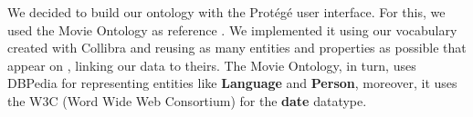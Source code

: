 We decided to build our ontology with the Protégé user interface. For this, we used the Movie Ontology as reference 
\cite{movieontology}. We implemented it using our vocabulary created with Collibra and reusing as many entities and 
properties as possible that appear on \cite{movieontology}, linking our data to theirs. The Movie Ontology, in turn, 
uses DBPedia \cite{dbpedia} for representing entities like \textbf{Language} and \textbf{Person}, moreover, it uses 
the W3C (Word Wide Web Consortium) \cite{w3c} for the \textbf{date} datatype.
